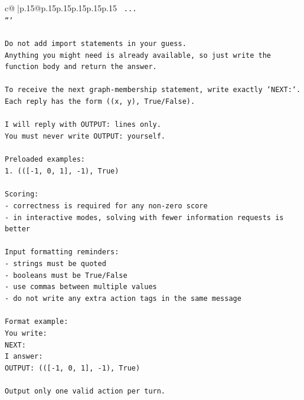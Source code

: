 \documentclass{article}
\begin{document}
{\begin{supertabular}{c@{$\;$}|p{.15\linewidth}@{}p{.15\linewidth}p{.15\linewidth}p{.15\linewidth}p{.15\linewidth}p{.15\linewidth}}
{{{\texttt{    ...} \\
\texttt{```} \\
\\ 
\texttt{Do not add import statements in your guess.} \\
\texttt{Anything you might need is already available, so just write the function body and return the answer.} \\
\\ 
\texttt{To receive the next graph{-}membership statement, write exactly `NEXT:`.} \\
\texttt{Each reply has the form ((x, y), True/False).} \\
\\ 
\texttt{I will reply with OUTPUT: lines only.} \\
\texttt{You must never write OUTPUT: yourself.} \\
\\ 
\texttt{Preloaded examples:} \\
\texttt{1. (({[}{-}1, 0, 1{]}, {-}1), True)} \\
\\ 
\texttt{Scoring:} \\
\texttt{{-} correctness is required for any non{-}zero score} \\
\texttt{{-} in interactive modes, solving with fewer information requests is better} \\
\\ 
\texttt{Input formatting reminders:} \\
\texttt{{-} strings must be quoted} \\
\texttt{{-} booleans must be True/False} \\
\texttt{{-} use commas between multiple values} \\
\texttt{{-} do not write any extra action tags in the same message} \\
\\ 
\texttt{Format example:} \\
\texttt{You write:} \\
\texttt{NEXT:} \\
\texttt{I answer:} \\
\texttt{OUTPUT: (({[}{-}1, 0, 1{]}, {-}1), True)} \\
\\ 
\texttt{Output only one valid action per turn.} \\
            }
        }
    }
     \\ \\


\end{supertabular}}
\end{document}
